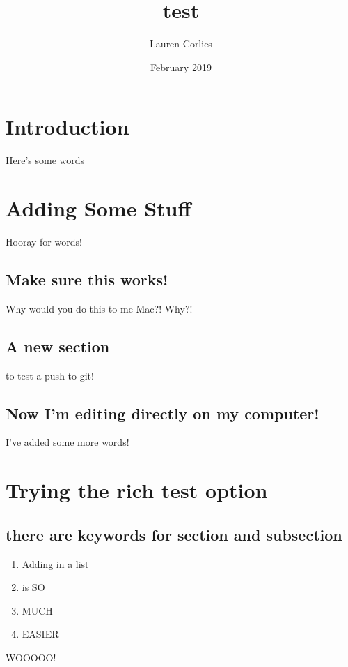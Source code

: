 \documentclass{article}
\title{test}
\author{Lauren Corlies}
\date{February 2019}
\begin{document}
\maketitle

\section{Introduction}
Here's some words

\section{Adding Some Stuff}
Hooray for words!

\subsection{Make sure this works!}
Why would you do this to me Mac?! Why?!

\subsection{A new section}
to test a push to git!

\subsection{Now I'm editing directly on my computer!}
I've added some more words!

\section{Trying the rich test option}
\subsection{there are keywords for section and subsection}
\begin{enumerate}
\item Adding in a list
\item is SO 
\item MUCH
\item EASIER
\end{enumerate}

WOOOOO!
\end{document}
